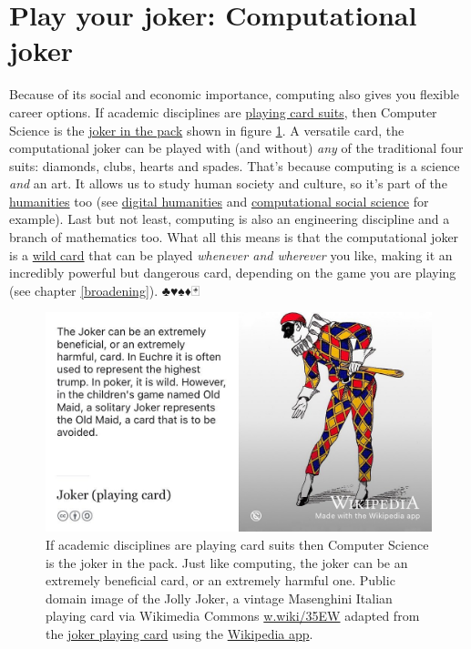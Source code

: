 \documentclass[
]{book}
\begin{document}
\hypertarget{joker}{%
\section{Play your joker: Computational joker}\label{joker}}

Because of its social and economic importance, computing also gives you flexible career options. If academic disciplines are \href{https://en.wikipedia.org/wiki/Playing_card_suit}{playing card suits}, then Computer Science is the \href{https://en.wikipedia.org/wiki/Joker_(playing_card)}{joker in the pack} shown in figure \ref{fig:joker-fig}. A versatile card, the computational joker can be played with (and without) \emph{any} of the traditional four suits: diamonds, clubs, hearts and spades. That's because computing is a science \emph{and} an art. It allows us to study human society and culture, so it's part of the \href{https://en.wikipedia.org/wiki/Humanities}{humanities} too (see \href{https://en.wikipedia.org/wiki/Digital_humanities}{digital humanities} and \href{https://en.wikipedia.org/wiki/Computational_social_science}{computational social science} for example). Last but not least, computing is also an engineering discipline and a branch of mathematics too. What all this means is that the computational joker is a \href{https://en.wikipedia.org/wiki/Wild_card_(cards)}{wild card} that can be played \emph{whenever and wherever} you like, making it an incredibly powerful but dangerous card, depending on the game you are playing (see chapter \ref{broadening}). ♣♥♠♦🃏

\begin{figure}

{\centering \includegraphics[width=1\linewidth]{images/wikijoker} 

}

\caption{If academic disciplines are playing card suits then Computer Science is the joker in the pack. Just like computing, the joker can be an extremely beneficial card, or an extremely harmful one. Public domain image of the Jolly Joker, a vintage Masenghini Italian playing card via Wikimedia Commons \href{https://w.wiki/35EW}{w.wiki/35EW} adapted from the \href{https://en.wikipedia.org/wiki/Joker_(playing_card)}{joker playing card} using the \href{https://apps.apple.com/gb/app/wikipedia/id324715238}{Wikipedia app}.}\label{fig:joker-fig}
\end{figure}
\end{document}
